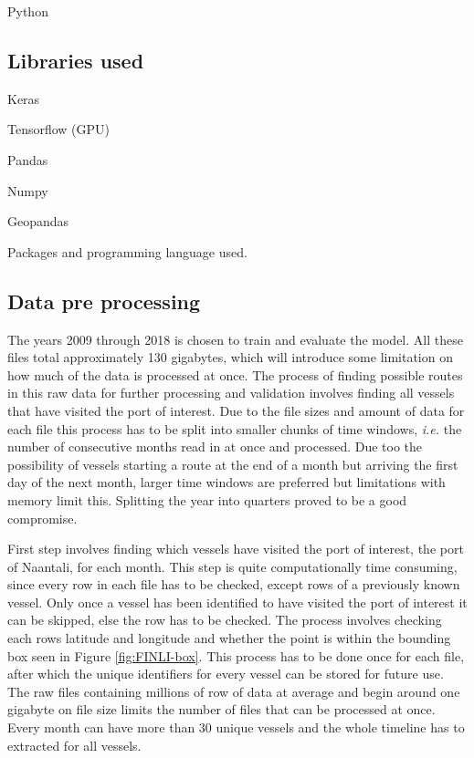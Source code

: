 \documentclass[../main.tex]{subfiles}
\begin{document}
Python
\subsection{Libraries used}

Keras

Tensorflow (GPU)

Pandas

Numpy

Geopandas

Packages and programming language used.


\subsection{Data pre processing}

The years 2009 through 2018 is chosen to train and evaluate the model. All these files total approximately 130 gigabytes, which will introduce some limitation on how much of the data is processed at once. The process of finding possible routes in this raw data for further processing and validation involves finding all vessels that have visited the port of interest. Due to the file sizes and amount of data for each file this process has to be split into smaller chunks of time windows, \textit{i.e.} the number of consecutive months read in at once and processed. Due too the possibility of vessels starting a route at the end of a month but arriving the first day of the next month, larger time windows are preferred but limitations with memory limit this. Splitting the year into quarters proved to be a good compromise.

First step involves finding which vessels have visited the port of interest, the port of Naantali, for each month. This step is quite computationally time consuming, since every row in each file has to be checked, except rows of a previously known vessel. Only once a vessel has been identified to have visited the port of interest it can be skipped, else the row has to be checked. The process involves checking each rows latitude and longitude and whether the point is within the bounding box seen in Figure \ref{fig:FINLI-box}. This process has to be done once for each file, after which the unique identifiers for every vessel can be stored for future use. The raw files containing millions of row of data at average and begin around one gigabyte on file size limits the number of files that can be processed at once. Every month can have more than 30 unique vessels and the whole timeline has to extracted for all vessels.
\end{document}
